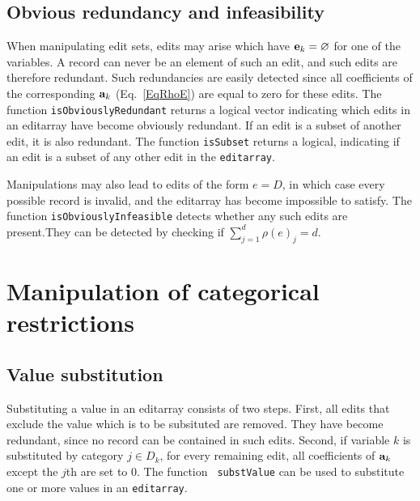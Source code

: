 \documentclass[11pt, fleqn, a4paper]{article}
\begin{document}
\subsection{Obvious redundancy and infeasibility}
When manipulating edit sets, edits may arise which have ${\bf e}_k=\varnothing$
for one of the variables. A record can never be an element of such an edit, and
such edits are therefore redundant. Such redundancies are easily detected since
all coefficients of the corresponding ${\bf a}_k$ (Eq.\ \eqref{EqRhoE}) are
equal to zero for these edits. The function {\tt isObviouslyRedundant} returns
a logical vector indicating which edits in an editarray have become obviously
redundant.  If an edit is a subset of another edit, it is also redundant. The
function {\tt isSubset} returns a logical, indicating if an edit is a subset of
any other edit in the {\tt editarray}.

Manipulations may also lead to edits of the form $e=D$, in which case every possible
record is invalid, and the editarray has become impossible to satisfy. The function
{\tt isObviouslyInfeasible} detects whether any such edits are present.They can be 
detected by checking if $\sum_{j=1}^d\rho(e)_j=d$.


\section{Manipulation of categorical restrictions}

\subsection{Value substitution}
Substituting a value in an editarray consists of two steps. First, all edits
that exclude the value which is to be subsituted are removed. They have become
redundant, since no record can be contained in such edits. Second, if variable
$k$ is substituted by category $j\in D_k$, for every remaining edit, all
coefficients of ${\bf a}_k$ except the $j$th are set to 0.  The function {\tt
substValue} can be used to substitute one or more values in an {\tt editarray}.
\end{document}
